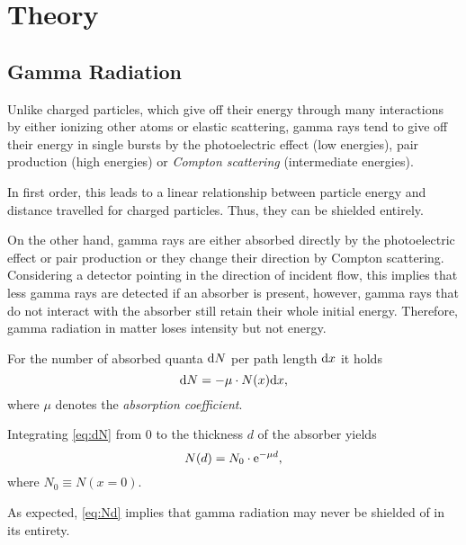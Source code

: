 \chapter{Theory}

\section{Gamma Radiation}
Unlike charged particles, which give off their energy through many interactions by either ionizing other atoms or elastic scattering, gamma rays tend to give off their energy in single bursts by the photoelectric effect (low energies), pair production (high energies) or \textit{Compton scattering} (intermediate energies).

In first order, this leads to a linear relationship between particle energy and distance travelled for charged particles. Thus, they can be shielded entirely.

On the other hand, gamma rays are either absorbed directly by the photoelectric effect or pair production or they change their direction by Compton scattering. Considering a detector pointing in the direction of incident flow, this implies that less gamma rays are detected if an absorber is present, however, gamma rays that do not interact with the absorber still retain their whole initial energy. Therefore, gamma radiation in matter loses intensity but not energy.

For the number of absorbed quanta $\text{d} N$ per path length $\text{d} x$ it holds
\begin{equation}\label{eq:dN}
	\text{d} N = -\mu\cdot N(x)\text{d} x,
\end{equation}
where $\mu$ denotes the \textit{absorption coefficient}.

Integrating \autoref{eq:dN} from 0 to the thickness $d$ of the absorber yields
\begin{equation}\label{eq:Nd}
	N(d) = N_0\cdot\mathrm{e}^{-\mu d},
\end{equation}
where $N_0\equiv N(x=0)$.

As expected, \autoref{eq:Nd} implies that gamma radiation may never be shielded of in its entirety.

